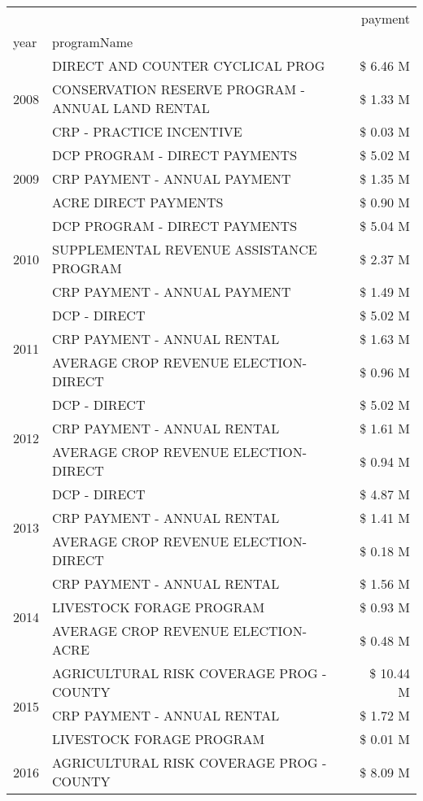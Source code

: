 \begin{tabular}{llr}
\toprule
 &  & payment \\
year & programName &  \\
\midrule
\multirow[t]{3}{*}{2008} & DIRECT AND COUNTER CYCLICAL PROG & \$ 6.46 M \\
 & CONSERVATION RESERVE PROGRAM - ANNUAL LAND RENTAL & \$ 1.33 M \\
 & CRP - PRACTICE INCENTIVE & \$ 0.03 M \\
\cline{1-3}
\multirow[t]{3}{*}{2009} & DCP PROGRAM - DIRECT PAYMENTS & \$ 5.02 M \\
 & CRP PAYMENT - ANNUAL PAYMENT & \$ 1.35 M \\
 & ACRE DIRECT PAYMENTS & \$ 0.90 M \\
\cline{1-3}
\multirow[t]{3}{*}{2010} & DCP PROGRAM - DIRECT PAYMENTS & \$ 5.04 M \\
 & SUPPLEMENTAL REVENUE ASSISTANCE PROGRAM & \$ 2.37 M \\
 & CRP PAYMENT - ANNUAL PAYMENT & \$ 1.49 M \\
\cline{1-3}
\multirow[t]{3}{*}{2011} & DCP - DIRECT & \$ 5.02 M \\
 & CRP PAYMENT - ANNUAL RENTAL & \$ 1.63 M \\
 & AVERAGE CROP REVENUE ELECTION-DIRECT & \$ 0.96 M \\
\cline{1-3}
\multirow[t]{3}{*}{2012} & DCP - DIRECT & \$ 5.02 M \\
 & CRP PAYMENT - ANNUAL RENTAL & \$ 1.61 M \\
 & AVERAGE CROP REVENUE ELECTION-DIRECT & \$ 0.94 M \\
\cline{1-3}
\multirow[t]{3}{*}{2013} & DCP - DIRECT & \$ 4.87 M \\
 & CRP PAYMENT - ANNUAL RENTAL & \$ 1.41 M \\
 & AVERAGE CROP REVENUE ELECTION-DIRECT & \$ 0.18 M \\
\cline{1-3}
\multirow[t]{3}{*}{2014} & CRP PAYMENT - ANNUAL RENTAL & \$ 1.56 M \\
 & LIVESTOCK FORAGE PROGRAM & \$ 0.93 M \\
 & AVERAGE CROP REVENUE ELECTION-ACRE & \$ 0.48 M \\
\cline{1-3}
\multirow[t]{3}{*}{2015} & AGRICULTURAL RISK COVERAGE PROG - COUNTY & \$ 10.44 M \\
 & CRP PAYMENT - ANNUAL RENTAL & \$ 1.72 M \\
 & LIVESTOCK FORAGE PROGRAM & \$ 0.01 M \\
\cline{1-3}
\multirow[t]{3}{*}{2016} & AGRICULTURAL RISK COVERAGE PROG - COUNTY & \$ 8.09 M \\

\end{tabular}
